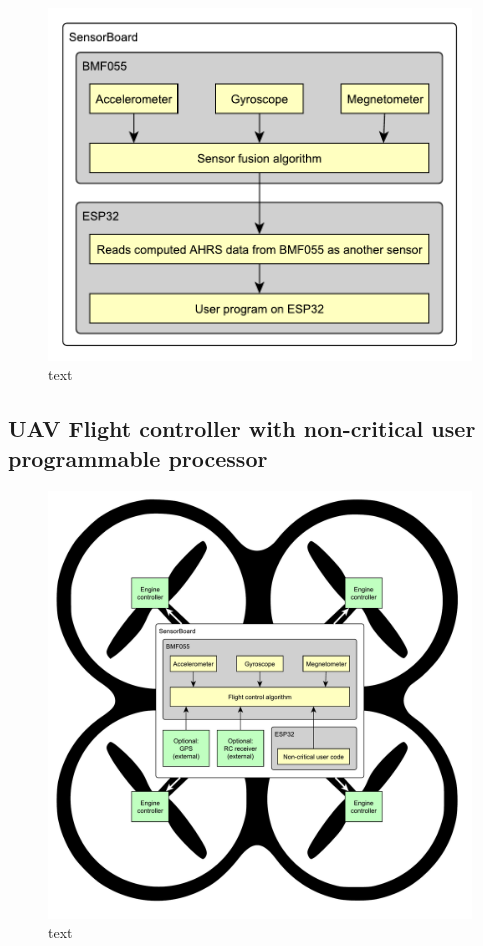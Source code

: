 \begin{figure}[H]
	\centering
	\label{UELogging1}
	\caption{text}
	\includegraphics[scale=1]{img/UsageExamplesAHRSBMF.pdf}
\end{figure}

\subsection{UAV Flight controller with non-critical user programmable processor}

\begin{figure}[H]
	\centering
	\label{UELogging1}
	\caption{text}
	\includegraphics[width=16cm]{img/UsageExamplesFlightController.pdf}
\end{figure}

